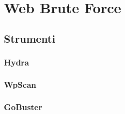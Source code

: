 \chapter{Web Brute Force}
\section{Strumenti}
\subsection{Hydra}
\subsection{WpScan}
\subsection{GoBuster}
\label{chap:conc}
